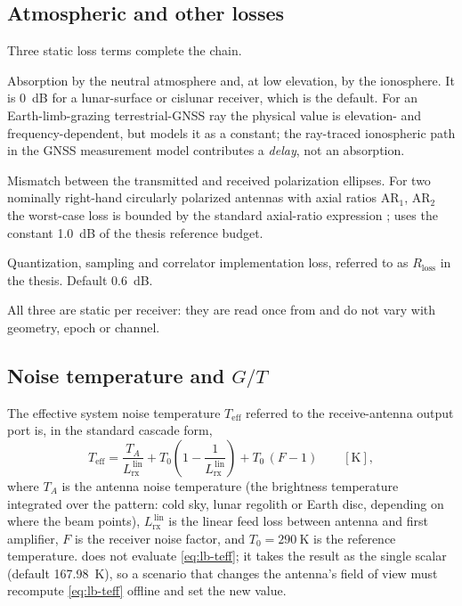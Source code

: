 \subsection{Atmospheric and other losses}
\label{sec:lb-losses}

Three static loss terms complete the chain.

\begin{description}[leftmargin=0pt, style=nextline]
  \item[Atmospheric loss $L_\mathrm{atm}$.]  Absorption by the neutral
        atmosphere and, at low elevation, by the ionosphere.  It is
        \SI{0}{\dB} for a lunar-surface or cislunar receiver, which is the
        default.  For an Earth-limb-grazing terrestrial-GNSS ray the physical
        value is elevation- and frequency-dependent, but \lupnt{} models it as
        a constant; the ray-traced ionospheric path in the GNSS measurement
        model contributes a \emph{delay}, not an absorption.
  \item[Polarization loss $L_\mathrm{pol}$.]  Mismatch between the transmitted
        and received polarization ellipses.  For two nominally right-hand
        circularly polarized antennas with axial ratios $\mathrm{AR}_1$,
        $\mathrm{AR}_2$ the worst-case loss is bounded by the standard
        axial-ratio expression \citep{kaplan2017}; \lupnt{} uses the constant
        \SI{1.0}{\dB} of the thesis reference budget.
  \item[Implementation loss $L_\mathrm{ad}$.]  Quantization, sampling and
        correlator implementation loss, referred to as $R_\mathrm{loss}$ in
        the thesis.  Default \SI{0.6}{\dB}.
\end{description}

All three are static per receiver: they are read once from
 and do not vary with geometry, epoch or channel.

\subsection{Noise temperature and $G/T$}
\label{sec:lb-gt}

The effective system noise temperature $T_\mathrm{eff}$ referred to the
receive-antenna output port is, in the standard cascade form,
\begin{equation}
  T_\mathrm{eff}
  =
  \frac{T_A}{L_\mathrm{rx}^{\,\mathrm{lin}}}
  + T_0\left(1 - \frac{1}{L_\mathrm{rx}^{\,\mathrm{lin}}}\right)
  + T_0\,(F - 1)
  \qquad [\si{\kelvin}],
  \label{eq:lb-teff}
\end{equation}
where $T_A$ is the antenna noise temperature (the brightness temperature
integrated over the pattern: cold sky, lunar regolith or Earth disc,
depending on where the beam points), $L_\mathrm{rx}^{\,\mathrm{lin}}$ is the
linear feed loss between antenna and first amplifier, $F$ is the receiver
noise factor, and $T_0 = \SI{290}{\kelvin}$ is the reference temperature.
\lupnt{} does not evaluate \cref{eq:lb-teff}; it takes the result as the single
scalar  (default \SI{167.98}{\kelvin}), so a scenario
that changes the antenna's field of view must recompute
\cref{eq:lb-teff} offline and set the new value.

